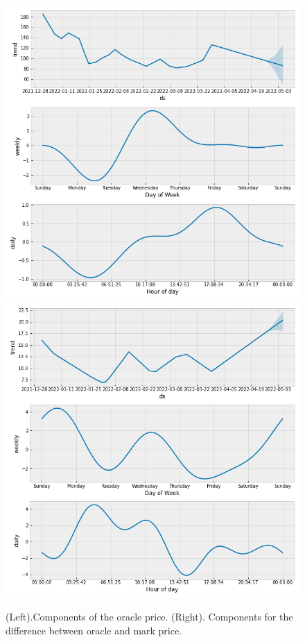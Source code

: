 \documentclass[]{scrartcl}
\begin{document}
 
  		\begin{figure}
 	\centering
 	\includegraphics[width=0.47\linewidth]{figures/oracle_comps.png}
 	\includegraphics[width=0.47\linewidth]{figures/forecast_comps.png}
 	\caption{(Left).Components of the oracle price. (Right). Components for the difference between oracle and mark price.}
 	\label{fig:comps}
 \end{figure}
	
\end{document}
